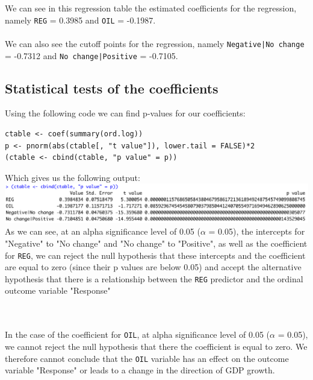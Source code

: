 \documentclass[12pt,letterpaper]{article}
\begin{document}
\noindent We can see in this regression table the estimated coefficients for the regression, namely \texttt{REG} = 0.3985 and \texttt{OIL} = -0.1987.
\\\\
\noindent We can also see the cutoff points for the regression, namely \texttt{Negative|No change} = -0.7312 and \texttt{No change|Positive} = -0.7105.

\pagebreak
\subsection{Statistical tests of the coefficients}

\noindent Using the following code we can find p-values for our coefficients:
\\

\begin{lstlisting}
ctable <- coef(summary(ord.log))
p <- pnorm(abs(ctable[, "t value"]), lower.tail = FALSE)*2
(ctable <- cbind(ctable, "p value" = p))
\end{lstlisting}

\noindent Which gives us the following output:
\\

\includegraphics[width=\linewidth]{ord.log.reg2}
\\

\noindent As we can see, at an alpha significance level of 0.05 ($\alpha$ = 0.05), the intercepts for "Negative" to "No change" and "No change" to "Positive", as well as the coefficient for \texttt{REG}, we can reject the null hypothesis that these intercepts and the coefficient are equal to zero (since their p values are below 0.05) and accept the alternative hypothesis that there is a relationship between the \texttt{REG} predictor and the ordinal outcome variable "Response"
\\\\\

\noindent In the case of the coefficient for \texttt{OIL}, at alpha significance level of 0.05 ($\alpha$ = 0.05), we cannot reject the null hypothesis that there the coefficient is equal to zero. We therefore cannot conclude that the \texttt{OIL} variable has an effect on the outcome variable "Response" or leads to a change in the direction of GDP growth.
\\\\
\end{document}
